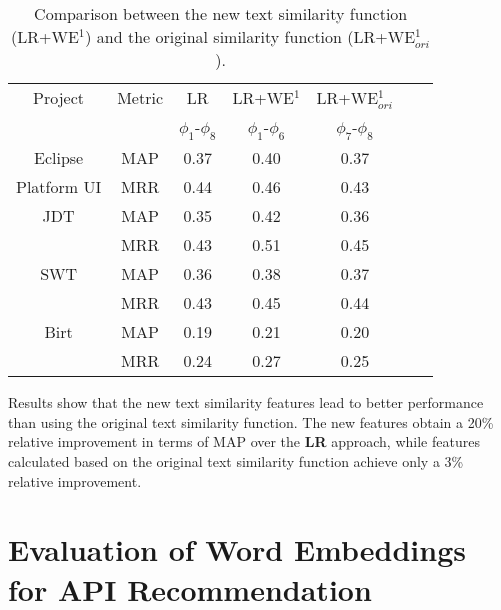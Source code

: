\begin{table}[ht]
\centering
\caption{Comparison between the new text similarity function (LR+WE$^1$) and the original similarity function (LR+WE$^1_{ori}$).}
\begin{adjustbox}{width=0.47\textwidth}
\begin{tabular}{|c|c|c|c|c|c|c|} \hline
Project & Metric & LR & LR+WE$^1$ & LR+WE$^1_{ori}$ \\
& & $\phi_1$-$\phi_8$ & $\phi_1$-$\phi_6$ & $\phi_7$-$\phi_8$ \\ \hline
Eclipse & MAP & 0.37 & 0.40 & 0.37\\
Platform UI& MRR & 0.44 & 0.46 & 0.43\\ \hline
JDT& MAP & 0.35 & 0.42 & 0.36\\
& MRR & 0.43 & 0.51 & 0.45\\ \hline
SWT& MAP & 0.36 & 0.38 & 0.37\\
& MRR & 0.43 & 0.45 & 0.44\\ \hline
Birt& MAP & 0.19 & 0.21 & 0.20\\
& MRR & 0.24 & 0.27 & 0.25\\ \hline
\end{tabular}
\end{adjustbox}
\label{tab:comparison of text similarity function}
\end{table}

Results show that the new text similarity features lead to better performance than using the original text similarity function. The new features obtain a 20\% relative improvement in terms of MAP over the \textbf{LR} approach, while features calculated based on the original text similarity function achieve only a 3\% relative improvement.


\section{Evaluation of Word Embeddings for API Recommendation}
\label{sec:evaluation:SO}


